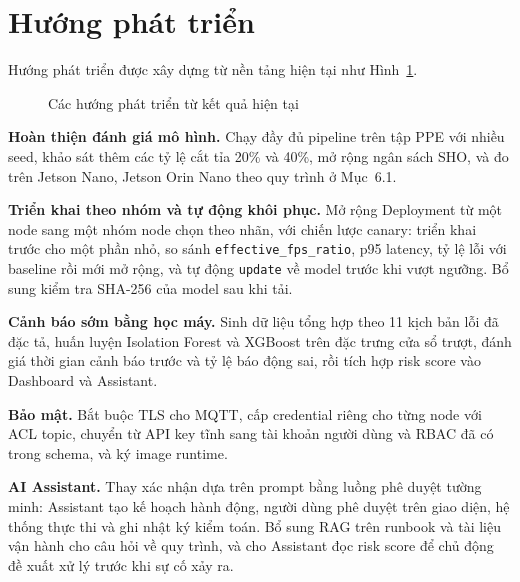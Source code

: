 \section{Hướng phát triển}

Hướng phát triển được xây dựng từ nền tảng hiện tại như
Hình~\ref{fig:future-directions}.

\begin{figure}[H]
\centering
{}
\caption{Các hướng phát triển từ kết quả hiện tại}
\label{fig:future-directions}
\end{figure}

\textbf{Hoàn thiện đánh giá mô hình.} Chạy đầy đủ pipeline trên tập PPE với
nhiều seed, khảo sát thêm các tỷ lệ cắt tỉa 20\% và 40\%, mở rộng ngân sách SHO,
và đo trên Jetson Nano, Jetson Orin Nano theo quy trình ở Mục~6.1.

\textbf{Triển khai theo nhóm và tự động khôi phục.} Mở rộng Deployment từ một
node sang một nhóm node chọn theo nhãn, với chiến lược canary: triển khai trước
cho một phần nhỏ, so sánh \texttt{effective\_fps\_ratio}, p95 latency, tỷ lệ lỗi
với baseline rồi mới mở rộng, và tự động \texttt{update} về model trước khi vượt
ngưỡng. Bổ sung kiểm tra SHA-256 của model sau khi tải.

\textbf{Cảnh báo sớm bằng học máy.} Sinh dữ liệu tổng hợp theo 11 kịch bản lỗi
đã đặc tả, huấn luyện Isolation Forest và XGBoost trên đặc trưng cửa sổ trượt,
đánh giá thời gian cảnh báo trước và tỷ lệ báo động sai, rồi tích hợp risk score
vào Dashboard và Assistant.

\textbf{Bảo mật.} Bắt buộc TLS cho MQTT, cấp credential riêng cho từng node với
ACL topic, chuyển từ API key tĩnh sang tài khoản người dùng và RBAC đã có trong
schema, và ký image runtime.

\textbf{AI Assistant.} Thay xác nhận dựa trên prompt bằng luồng phê duyệt tường
minh: Assistant tạo kế hoạch hành động, người dùng phê duyệt trên giao diện, hệ
thống thực thi và ghi nhật ký kiểm toán. Bổ sung RAG trên runbook và tài liệu vận
hành cho câu hỏi về quy trình, và cho Assistant đọc risk score để chủ động đề xuất
xử lý trước khi sự cố xảy ra.
